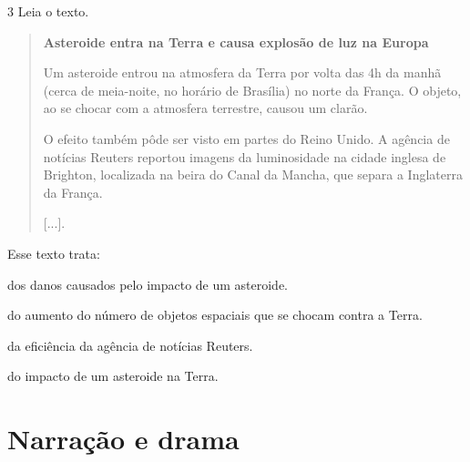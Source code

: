 
\num{3} Leia o texto.

\begin{quote}
\textbf{Asteroide entra na Terra e causa explosão de luz na Europa}

Um asteroide entrou na atmosfera da Terra por volta das 4h da manhã
(cerca de meia-noite, no horário de Brasília) no norte da França. O
objeto, ao se chocar com a atmosfera terrestre, causou um clarão.

O efeito também pôde ser visto em partes do Reino Unido. A agência de
notícias Reuters reportou imagens da luminosidade na cidade inglesa de
Brighton, localizada na beira do Canal da Mancha, que separa a
Inglaterra da França.

{[}...{]}.

\end{quote}

\pagebreak
Esse texto trata:

\begin{escolha}
\item dos danos causados pelo impacto de um asteroide.

\item do aumento do número de objetos espaciais que se chocam contra a Terra.

\item da eficiência da agência de notícias Reuters.

\item do impacto de um asteroide na Terra.
\end{escolha}


\chapter{Narração e drama}

\vspace*{-1\baselineskip}


